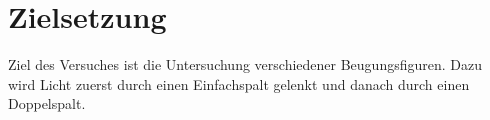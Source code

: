\section{Zielsetzung}
Ziel des Versuches ist die Untersuchung verschiedener Beugungsfiguren.
Dazu wird Licht zuerst durch einen Einfachspalt gelenkt und danach durch einen Doppelspalt.